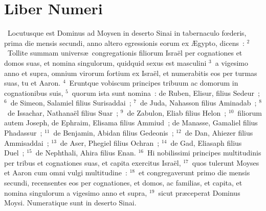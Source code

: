 \clearpage
{\centering \section*{Liber Numeri}}\thispagestyle{empty}

~Locutusque est Dominus ad Moysen in deserto Sinai in tabernaculo fœderis, prima die mensis secundi, anno altero egressionis eorum ex \AE gypto, dicens~:
${}^{2}$~Tollite summam univers\ae\ congregationis filiorum Isra\"el per cognationes et domos suas, et nomina singulorum, quidquid sexus est masculini
${}^{3}$~a vigesimo anno et supra, omnium virorum fortium ex Isra\"el, et numerabitis eos per turmas suas, tu et Aaron.
${}^{4}$~Eruntque vobiscum principes tribuum ac domorum in cognationibus suis,
${}^{5}$~quorum ista sunt nomina~: de Ruben, Elisur, filius Sedeur~;
${}^{6}$~de Simeon, Salamiel filius Surisaddai~;
${}^{7}$~de Juda, Nahasson filius Aminadab~;
${}^{8}$~de Issachar, Nathana\"el filius Suar~;
${}^{9}$~de Zabulon, Eliab filius Helon~;
${}^{10}$~filiorum autem Joseph, de Ephraim, Elisama filius Ammiud~; de Manasse, Gamaliel filius Phadassur~;
${}^{11}$~de Benjamin, Abidan filius Gedeonis~;
${}^{12}$~de Dan, Ahiezer filius Ammisaddai~;
${}^{13}$~de Aser, Phegiel filius Ochran~;
${}^{14}$~de Gad, Eliasaph filius Duel~;
${}^{15}$~de Nephthali, Ahira filius Enan.
${}^{16}$~Hi nobilissimi principes multitudinis per tribus et cognationes suas, et capita exercitus Isra\"el,
${}^{17}$~quos tulerunt Moyses et Aaron cum omni vulgi multitudine~:
${}^{18}$~et congregaverunt primo die mensis secundi, recensentes eos per cognationes, et domos, ac familias, et capita, et nomina singulorum a vigesimo anno et supra,
${}^{19}$~sicut pr\ae ceperat Dominus Moysi. Numeratique sunt in deserto Sinai.


